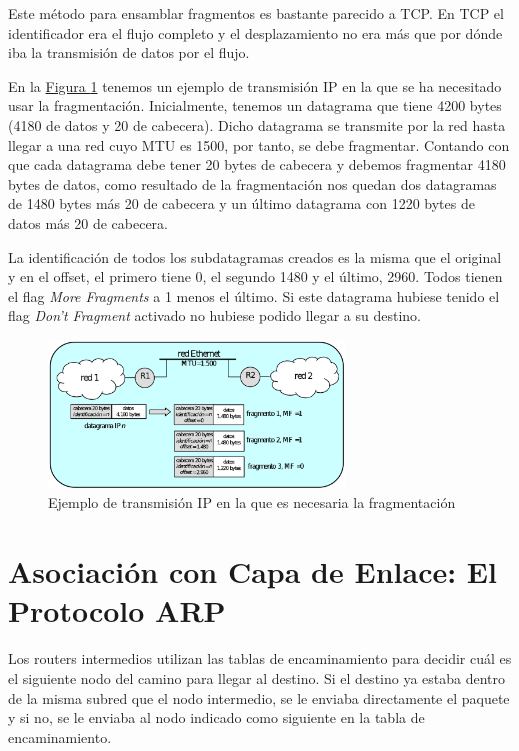 \documentclass[10pt,a4paper,spanish]{report}
\begin{document}
Este método para ensamblar fragmentos es bastante parecido a TCP. En TCP el identificador era el flujo completo y el desplazamiento no era más que por dónde iba la transmisión de datos por el flujo.

En la \hyperref[fragIPej]{Figura \ref*{fragIPej}} tenemos un ejemplo de transmisión IP en la que se ha necesitado usar la fragmentación. Inicialmente, tenemos un datagrama que tiene 4200 bytes (4180 de datos y 20 de cabecera). Dicho datagrama se transmite por la red hasta llegar a una red cuyo MTU es 1500, por tanto, se debe fragmentar. Contando con que cada datagrama debe tener 20 bytes de cabecera y debemos fragmentar 4180 bytes de datos, como resultado de la fragmentación nos quedan dos datagramas de 1480 bytes más 20 de cabecera y un último datagrama con 1220 bytes de datos más 20 de cabecera.

La identificación de todos los subdatagramas creados es la misma que el original y en el offset, el primero tiene 0, el segundo 1480 y el último, 2960. Todos tienen el flag \textit{\textcolor{tema4}{More Fragments}} a 1 menos el último. Si este datagrama hubiese tenido el flag \textit{\textcolor{tema4}{Don't Fragment}} activado no hubiese podido llegar a su destino.

\begin{figure}[!h]
  \centering
  \includegraphics[width=0.7\textwidth]{ejemplo_fragmentacionIP}
  \caption{Ejemplo de transmisión IP en la que es necesaria la fragmentación}
  \label{fragIPej}
\end{figure}

\section{\textcolor{tema4}Asociación con Capa de Enlace: El Protocolo ARP}
Los routers intermedios utilizan las tablas de encaminamiento para decidir cuál es el siguiente nodo del camino para llegar al destino. Si el destino ya estaba dentro de la misma subred que el nodo intermedio, se le enviaba directamente el paquete y si no, se le enviaba al nodo indicado como siguiente en la tabla de encaminamiento. 
\end{document}
